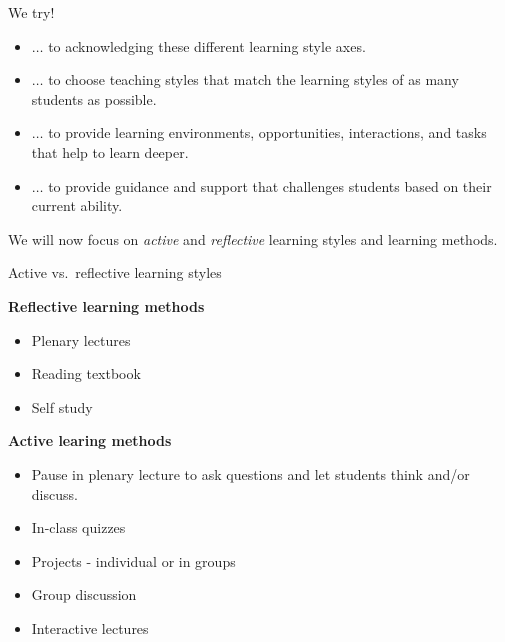 \documentclass[10pt,ignorenonframetext,]{beamer}
\providecommand{\tightlist}{%
  \setlength{\itemsep}{0pt}\setlength{\parskip}{0pt}}
\begin{document}
\begin{frame}

\begin{block}{We try!}

\vspace{2mm}

\begin{itemize}
\item
  \(\ldots\) to acknowledging these different learning style axes.
\item
  \(\ldots\) to choose teaching styles that match the learning styles of
  as many students as possible.
\item
  \(\ldots\) to provide learning environments, opportunities,
  interactions, and tasks that help to learn deeper.
\item
  \(\ldots\) to provide guidance and support that challenges students
  based on their current ability.
\end{itemize}

\vspace{2mm}

We will now focus on \emph{active} and \emph{reflective} learning styles
and learning methods.

\end{block}

\end{frame}

\begin{frame}

\begin{block}{Active vs.~reflective learning styles}

\vspace{2mm}

\textbf{Reflective learning methods}

\begin{itemize}
\tightlist
\item
  Plenary lectures
\item
  Reading textbook
\item
  Self study
\end{itemize}

\vspace{4mm}

\textbf{Active learing methods}

\begin{itemize}
\tightlist
\item
  Pause in plenary lecture to ask questions and let students think
  and/or discuss.
\item
  In-class quizzes 
\item
  Projects - individual or in groups
\item
  Group discussion
\item
  Interactive lectures
\end{itemize}

\end{block}

\end{frame}
\end{document}
